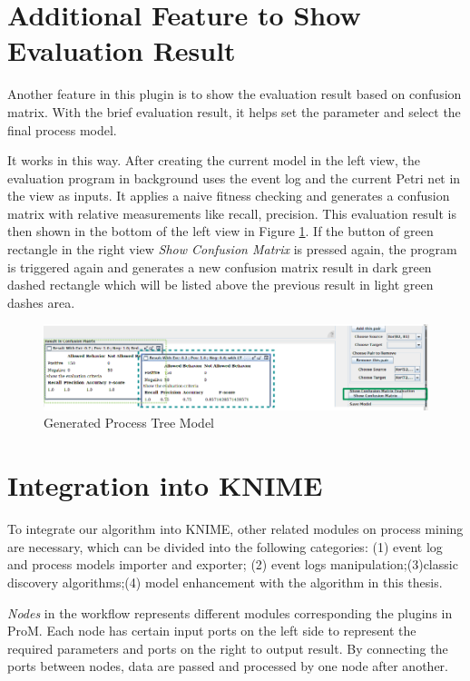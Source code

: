 \section{Additional Feature to Show Evaluation Result}
Another feature in this plugin  is to show the evaluation result based on confusion matrix. With the brief evaluation result, it helps set the parameter and select the final process model. 

It works in this way. After creating the current model in the left view, the evaluation program in background uses the event log and the current Petri net in the view as inputs. It applies a naive fitness checking and generates a confusion matrix with relative measurements like recall, precision. This evaluation result is then shown in the bottom of the left view in Figure \ref{fig:dfg-IM-cm}.  If the button of green rectangle in the right view \emph{Show Confusion Matrix} is pressed again, the program is triggered again and generates a new  confusion matrix result in  dark green dashed rectangle which will be listed above the previous result in light green dashes area. 
\begin{figure}
	\centering
	\includegraphics[width=\textwidth]{figures/implementation/dfg-IM-confusionmatrix.png}
	\caption{Generated Process Tree Model}
	\label{fig:dfg-IM-cm}
\end{figure}

\section{Integration into KNIME}
To integrate our algorithm into KNIME, other related modules on process mining are necessary, which can be divided into the following categories: (1) event log and process models importer and exporter; (2) event logs manipulation;(3)classic discovery algorithms;(4) model enhancement with the algorithm in this thesis. 

\emph{Nodes} in the workflow represents different modules corresponding the plugins in ProM. Each node has certain input ports on the left side to represent the required parameters and  ports on the right to output result. By connecting the ports between nodes, data are passed and processed by one node after another.
 
